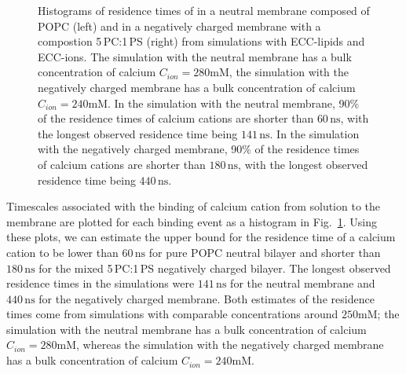 \begin{figure}[tb!]
{}\hfill
  \hfill
{}
  \caption{\label{fig:hist_residence_times}
   Histograms of residence times of  
   in a neutral membrane composed of POPC (left)
   and in a negatively charged membrane with a compostion 5\,PC:1\,PS (right)
   from simulations with ECC-lipids and ECC-ions.
   The simulation with the neutral membrane has a bulk concentration of calcium $C_{ion} = 280\mathrm{mM}$, 
   the simulation with the negatively charged membrane has a bulk concentration of calcium $C_{ion} = 240\mathrm{mM}$. 
   In the simulation with the neutral membrane, 
   90\% of the residence times of calcium cations are
   shorter than $60\,\mathrm{ns}$, %
   with the longest observed residence time being $141\,\mathrm{ns}$. 
   In the simulation with the negatively charged membrane, 
   90\% of the residence times of calcium cations are
   shorter than $180\,\mathrm{ns}$, %
   with the longest observed residence time being $440\,\mathrm{ns}$. 
   }
\end{figure}


Timescales associated with the binding of calcium cation from solution to the membrane
are plotted for each binding event as a histogram in Fig.~\ref{fig:hist_residence_times}. 
Using these plots, we can estimate the upper bound for the residence time of a calcium cation 
to be lower than $60\,\mathrm{ns}$ for pure POPC neutral bilayer 
and shorter than $180\,\mathrm{ns}$ for the mixed 5\,PC:1\,PS negatively charged bilayer. 
The longest observed residence times in the simulations were $141\,\mathrm{ns}$ for the neutral membrane 
and $440\,\mathrm{ns}$ for the negatively charged membrane. 
Both estimates of the residence times come from simulations with comparable concentrations around $250\mathrm{mM}$;
the simulation with the neutral membrane has a bulk concentration of calcium $C_{ion} = 280\mathrm{mM}$, 
whereas the simulation with the negatively charged membrane has a bulk concentration of calcium $C_{ion} = 240\mathrm{mM}$. 


